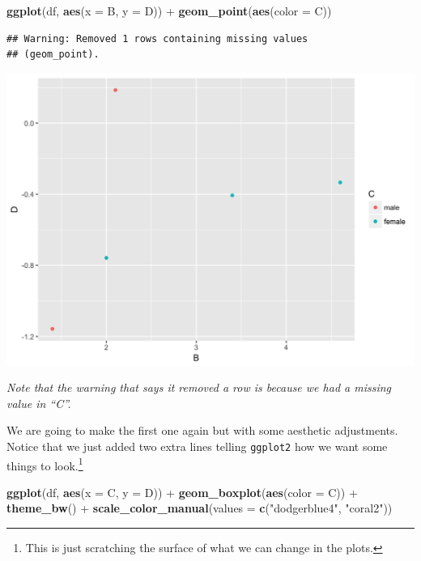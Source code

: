 \documentclass[]{tufte-book}
\newenvironment{Shaded}{}{}
\newcommand{\KeywordTok}[1]{\textcolor[rgb]{0.00,0.44,0.13}{\textbf{#1}}}
\newcommand{\DataTypeTok}[1]{\textcolor[rgb]{0.56,0.13,0.00}{#1}}
\newcommand{\StringTok}[1]{\textcolor[rgb]{0.25,0.44,0.63}{#1}}
\newcommand{\OperatorTok}[1]{\textcolor[rgb]{0.40,0.40,0.40}{#1}}
\newcommand{\NormalTok}[1]{#1}
\theoremstyle{definition}
\theoremstyle{definition}
\theoremstyle{remark}
\begin{document}
\begin{Shaded}
\begin{Highlighting}[]
\KeywordTok{ggplot}\NormalTok{(df, }\KeywordTok{aes}\NormalTok{(}\DataTypeTok{x =}\NormalTok{ B, }\DataTypeTok{y =}\NormalTok{ D)) }\OperatorTok{+}\StringTok{ }\KeywordTok{geom_point}\NormalTok{(}\KeywordTok{aes}\NormalTok{(}\DataTypeTok{color =}\NormalTok{ C))}
\end{Highlighting}
\end{Shaded}

\begin{verbatim}
## Warning: Removed 1 rows containing missing values
## (geom_point).
\end{verbatim}

\includegraphics{_main_files/figure-latex/unnamed-chunk-60-1}

\emph{Note that the warning that says it removed a row is because we had
a missing value in ``C''.}

We are going to make the first one again but with some aesthetic
adjustments. Notice that we just added two extra lines telling
\texttt{ggplot2} how we want some things to look.\footnote{This is just
  scratching the surface of what we can change in the plots.}

\begin{Shaded}
\begin{Highlighting}[]
\KeywordTok{ggplot}\NormalTok{(df, }\KeywordTok{aes}\NormalTok{(}\DataTypeTok{x =}\NormalTok{ C, }\DataTypeTok{y =}\NormalTok{ D)) }\OperatorTok{+}\StringTok{ }\KeywordTok{geom_boxplot}\NormalTok{(}\KeywordTok{aes}\NormalTok{(}\DataTypeTok{color =}\NormalTok{ C)) }\OperatorTok{+}\StringTok{ }
\StringTok{    }\KeywordTok{theme_bw}\NormalTok{() }\OperatorTok{+}\StringTok{ }\KeywordTok{scale_color_manual}\NormalTok{(}\DataTypeTok{values =} \KeywordTok{c}\NormalTok{(}\StringTok{"dodgerblue4"}\NormalTok{, }
    \StringTok{"coral2"}\NormalTok{))}
\end{Highlighting}
\end{Shaded}
\end{document}
